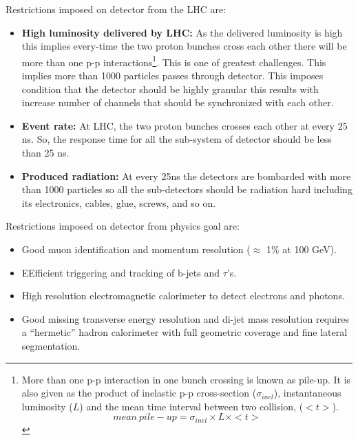 Restrictions imposed on detector from the LHC are:

\begin{itemize}
	\item \textbf{High luminosity delivered by LHC:} As the delivered luminosity is high this implies every-time the two proton bunches cross each other there will be more than one p-p interactions\footnote{More than one p-p interaction in one bunch crossing is known as pile-up. It is also given as the product of inelastic p-p cross-section ($\sigma_{inel}$), instantaneous luminosity ($L$) and the mean time interval between two collision, ($< t >$). \begin{equation}
		mean~pile-up = \sigma_{inel} \times L \times <t>
	\end{equation}}. This is one of greatest challenges. This implies more than 1000 particles passes through detector. This imposes condition that the detector should be highly granular this results with increase number of channels that should be synchronized with each other.
	\item \textbf{Event rate:} At LHC, the two proton bunches crosses each other at every 25 ns. So, the response time for all the sub-system of detector should be less than 25 ns.
	\item \textbf{Produced radiation:} At every 25ns the detectors are bombarded with more than 1000 particles so all the sub-detectors should be radiation hard including its electronics, cables, glue, screws, and so on.
\end{itemize}

Restrictions imposed on detector from physics goal are:

\begin{itemize}
	\item Good muon identification and momentum resolution ($\approx$ 1\% at 100 GeV).
	\item EEfficient triggering and tracking of b-jets and $\tau$'s.
	\item High resolution electromagnetic calorimeter to detect electrons and photons.
	\item Good missing transverse energy resolution and di-jet mass resolution requires a ``hermetic'' hadron calorimeter with full geometric coverage and fine lateral segmentation.
\end{itemize}


